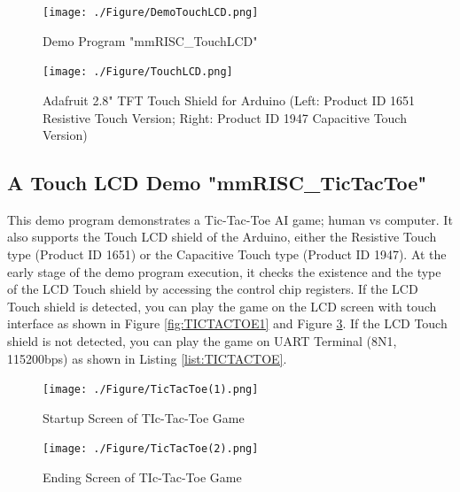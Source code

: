 \begin{figure}[H]
    \texttt{[image: ./Figure/DemoTouchLCD.png]}
    \caption{Demo Program "mmRISC\_TouchLCD"}
    \label{fig:DEMOTOUCHLCD}
\end{figure}

\begin{figure}[H]
    \texttt{[image: ./Figure/TouchLCD.png]}
    \caption{Adafruit 2.8" TFT Touch Shield for Arduino (Left: Product ID 1651 Resistive Touch Version; Right: Product ID 1947 Capacitive Touch Version)}
    \label{fig:TOUCHLCD}
\end{figure}

\subsection{A Touch LCD Demo "mmRISC\_TicTacToe"}
This demo program demonstrates a Tic-Tac-Toe AI game; human vs computer. It also supports the Touch LCD shield of the Arduino, either the Resistive Touch type (Product ID 1651) or the Capacitive Touch type (Product ID 1947). At the early stage of the demo program execution, it checks the existence and the type of the LCD Touch shield by accessing the control chip registers. If the LCD Touch shield is detected, you can play the game on the LCD screen with touch interface as shown in Figure \ref{fig:TICTACTOE1} and Figure \ref{fig:TICTACTOE2}. If the LCD Touch shield is not detected, you can play the game on UART Terminal (8N1, 115200bps) as shown in Listing \ref{list:TICTACTOE}.

\begin{figure}[H]
	\begin{minipage}[t]{0.5\columnwidth}
		\begin{center}
            \texttt{[image: ./Figure/TicTacToe(1).png]}
		\end{center}
		\caption{Startup Screen of TIc-Tac-Toe Game}
		\label{fig:TICTACTOE1}
	\end{minipage}%
	\begin{minipage}[t]{0.5\columnwidth}
		\begin{center}
            \texttt{[image: ./Figure/TicTacToe(2).png]}
		\end{center}
		\caption{Ending Screen of TIc-Tac-Toe Game}
		\label{fig:TICTACTOE2}
	\end{minipage}
\end{figure}

